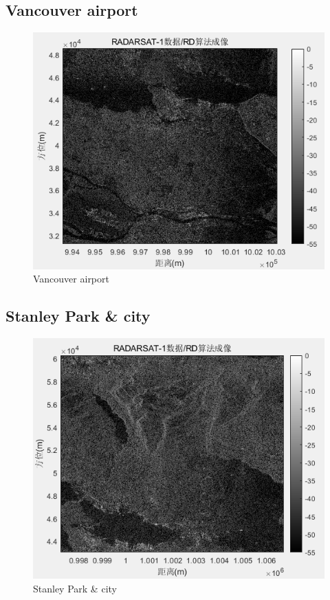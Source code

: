 \documentclass{article}
\begin{document}
\subsection{Vancouver airport}
\begin{figure}[H] %
	\centering
	\includegraphics[scale=0.6]{11.png}
	\caption{Vancouver airport}
	\label{11}
\end{figure}

\subsection{Stanley Park \& city}
\begin{figure}[H] %
	\centering
	\includegraphics[scale=0.6]{12.png}
	\caption{Stanley Park \& city}
	\label{12}
\end{figure}
\end{document}
